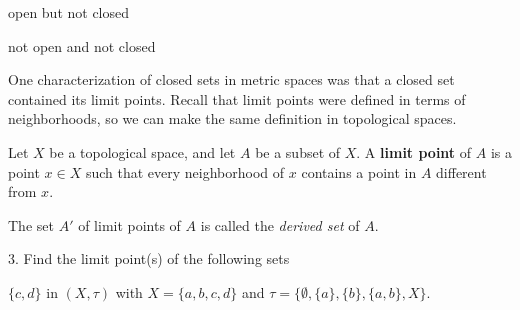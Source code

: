 \begin{pa}
\begin{comment}
\solution In the topological space $(X, \tau)$ with $X= \{a,b,c,d\}$ and $\tau = \{\emptyset, \{a\}, \{b\}, \{a,b\}, X \}$ the set $\{a,c,d\}$ is closed but not open. 



\end{comment}
	
	\item open but not closed
	
	

\begin{comment}

\solution In the topological space $(X, \tau)$ with $X= \{a,b,c,d\}$ and $\tau = \{\emptyset, \{a\}, \{b\}, \{a,b\}, X \}$ the set $\{a,b\}$ is open but not closed. 



\end{comment}
	
	\item not open and not closed
	
	

\begin{comment}

\solution Consider the topological space $(X, \tau)$ with $X= \{a,b,c,d\}$ and $\tau = \{\emptyset, \{a\}, \{b\}, \{a,b\}, X \}$. The set $\{b,c\}$ is neither open nor closed. 



\end{comment}
	
	\ea

\ee

One characterization of closed sets in metric spaces was that a closed set contained its limit points. Recall that limit points were defined in terms of neighborhoods, so we can make the same definition in topological spaces. 



\begin{definition} Let $X$ be a topological space, and let $A$ be a subset of $X$. A \textbf{limit point} of $A$ is a point $x \in X$ such that every neighborhood of $x$ contains a point in $A$ different from $x$. 
\end{definition}



The set $A'$ of limit points of $A$ is called the \emph{derived set} of $A$. 



\be 
\item[3.] Find the limit point(s) of the following sets
	\ba
	\item $\{c,d\}$ in $(X, \tau)$ with $X= \{a,b,c,d\}$ and $\tau = \{\emptyset, \{a\}, \{b\}, \{a,b\}, X \}$.




\end{pa}
